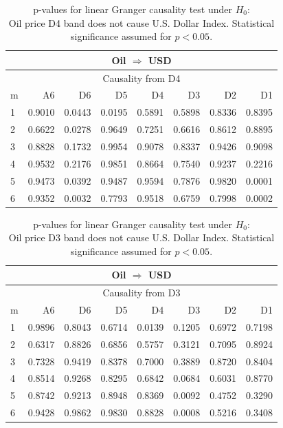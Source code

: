 %
%
\begin{table}[H]
\begin{center}
\begin{tabular}{l|r r r r r r r}
\hline\hline
\multicolumn{8}{c}{Oil $\Rightarrow$ USD}\\
\hline
\multicolumn{8}{c}{Causality from D4}\\
\hline\hline
m & A6 & D6 & D5 & D4 & D3 & D2 & D1 \\
\hline
1 & 0.9010 & \cellcolor{mygreen}0.0443 & \cellcolor{mygreen}0.0195 & 0.5891 & 0.5898 & 0.8336 & 0.8395 \\
2 & 0.6622 & \cellcolor{mygreen}0.0278 & 0.9649 & 0.7251 & 0.6616 & 0.8612 & 0.8895 \\
3 & 0.8828 & 0.1732 & 0.9954 & 0.9078 & 0.8337 & 0.9426 & 0.9098 \\
4 & 0.9532 & 0.2176 & 0.9851 & 0.8664 & 0.7540 & 0.9237 & 0.2216 \\
5 & 0.9473 & \cellcolor{mygreen}0.0392 & 0.9487 & 0.9594 & 0.7876 & 0.9820 & \cellcolor{mygreen}0.0001 \\
6 & 0.9352 & \cellcolor{mygreen}0.0032 & 0.7793 & 0.9518 & 0.6759 & 0.7998 & \cellcolor{mygreen}0.0002 \\
\hline\hline
\end{tabular}
\caption{p-values for linear Granger causality test under $H_0$:\\
Oil price D4 band does not cause U.S. Dollar Index. Statistical significance assumed for $p<0.05$.}
\end{center}
\end{table}

%
%
\begin{table}[H]
\begin{center}
\begin{tabular}{l|r r r r r r r}
\hline\hline
\multicolumn{8}{c}{Oil $\Rightarrow$ USD}\\
\hline
\multicolumn{8}{c}{Causality from D3}\\
\hline\hline
m & A6 & D6 & D5 & D4 & D3 & D2 & D1 \\
\hline
1 & 0.9896 & 0.8043 & 0.6714 & \cellcolor{mygreen}0.0139 & 0.1205 & 0.6972 & 0.7198 \\
2 & 0.6317 & 0.8826 & 0.6856 & 0.5757 & 0.3121 & 0.7095 & 0.8924 \\
3 & 0.7328 & 0.9419 & 0.8378 & 0.7000 & 0.3889 & 0.8720 & 0.8404 \\
4 & 0.8514 & 0.9268 & 0.8295 & 0.6842 & 0.0684 & 0.6031 & 0.8770 \\
5 & 0.8742 & 0.9213 & 0.8948 & 0.8369 & \cellcolor{mygreen}0.0092 & 0.4752 & 0.3290 \\
6 & 0.9428 & 0.9862 & 0.9830 & 0.8828 & \cellcolor{mygreen}0.0008 & 0.5216 & 0.3408 \\
\hline\hline
\end{tabular}
\caption{p-values for linear Granger causality test under $H_0$:\\
Oil price D3 band does not cause U.S. Dollar Index. Statistical significance assumed for $p<0.05$.}
\end{center}
\end{table}


